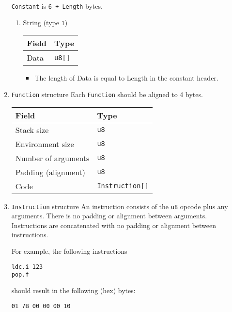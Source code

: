 \begin{enumerate}
\texttt{Constant} is \texttt{6 + Length} bytes.

\begin{enumerate}
\item String (type \texttt{1})
\label{sec:orge15c666}
\begin{center}
\begin{tabular}{ll}
Field & Type\\
\hline
Data & \texttt{u8[]}\\
\end{tabular}
\end{center}

\begin{itemize}
\item The length of Data is equal to Length in the constant header.
\end{itemize}
\end{enumerate}

\item \texttt{Function} structure
\label{sec:orgeccc7c7}
Each \texttt{Function} should be aligned to 4 bytes.

\begin{center}
\begin{tabular}{ll}
Field & Type\\
\hline
Stack size & \texttt{u8}\\
Environment size & \texttt{u8}\\
Number of arguments & \texttt{u8}\\
Padding (alignment) & \texttt{u8}\\
Code & \texttt{Instruction[]}\\
\end{tabular}
\end{center}

\item \texttt{Instruction} structure
\label{sec:org4132fac}
An instruction consists of the \texttt{u8} opcode plus any arguments. There is
no padding or alignment between arguments. Instructions are concatenated
with no padding or alignment between instructions.

For example, the following instructions

\begin{verbatim}
ldc.i 123
pop.f
\end{verbatim}

should result in the following (hex) bytes:

\texttt{01 7B 00 00 00 10}
\end{enumerate}
